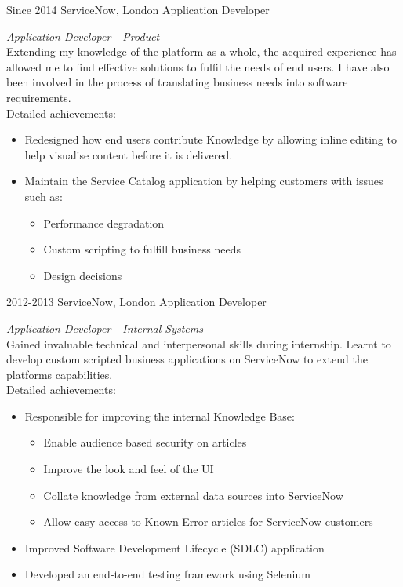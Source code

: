 \documentclass[]{friggeri-cv}
\begin{document}
\begin{entrylist}
  \entry
    {Since 2014}
    {ServiceNow, London}
    {Application Developer}
    {\emph{Application Developer - Product} \\
    Extending my knowledge of the platform as a whole, the acquired experience has allowed me to find effective solutions to fulfil the needs of end users. I have also been involved in the process of translating business needs into software requirements. \\
    Detailed achievements: 
    \begin{itemize}
    
        \item {Redesigned how end users contribute Knowledge by allowing inline editing to help visualise content before it is delivered.}
        \item {Maintain the Service Catalog application by helping customers with issues such as:}
        \begin{itemize}
            \item {Performance degradation}
            \item {Custom scripting to fulfill business needs}
            \item {Design decisions}
        \end{itemize}
    \end{itemize}
    }
  \entry
    {2012-2013}
    {ServiceNow, London}
    {Application Developer}
    {\emph{Application Developer - Internal Systems} \\
    Gained invaluable technical and interpersonal skills during internship. Learnt to develop custom scripted business applications on ServiceNow to extend the platforms capabilities. \\
    Detailed achievements:
    \begin{itemize}
        \item {Responsible for improving the internal Knowledge Base:}
             \begin{itemize}
                \item {Enable audience based security on articles}
                \item {Improve the look and feel of the UI}
                \item {Collate knowledge from external data sources into ServiceNow}
                \item {Allow easy access to Known Error articles for ServiceNow customers}
            \end{itemize}
        \item {Improved Software Development Lifecycle (SDLC) application}
        \item {Developed an end-to-end testing framework using Selenium}
    \end{itemize}
    }
\end{entrylist}
\end{document}
